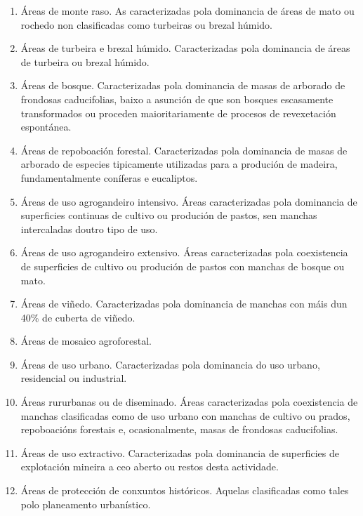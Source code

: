 \documentclass[11pt,a4paper]{article}
\begin{document}
\begin{enumerate}
 \item Áreas de monte raso. As caracterizadas pola dominancia de áreas de mato ou rochedo non clasificadas como turbeiras ou brezal húmido.
 \item Áreas de turbeira e brezal húmido. Caracterizadas pola dominancia de áreas de turbeira ou brezal húmido.
 \item Áreas de bosque. Caracterizadas pola dominancia de masas de arborado de frondosas caducifolias, baixo a asunción de que son bosques escasamente transformados ou proceden maioritariamente de procesos de revexetación espontánea.
 \item Áreas de repoboación forestal. Caracterizadas pola dominancia de masas de arborado de especies tipicamente utilizadas para a produción de madeira, fundamentalmente coníferas e eucaliptos.
 \item Áreas de uso agrogandeiro intensivo. Áreas caracterizadas pola dominancia de superficies continuas de cultivo ou produción de pastos, sen manchas intercaladas doutro tipo de uso.
 \item Áreas de uso agrogandeiro extensivo. Áreas caracterizadas pola coexistencia de superficies de cultivo ou produción de pastos con manchas de bosque ou mato.
 \item Áreas de viñedo. Caracterizadas pola dominancia de manchas con máis dun 40\% de cuberta de viñedo.
 \item Áreas de mosaico agroforestal.
 \item Áreas de uso urbano. Caracterizadas pola dominancia do uso urbano, residencial ou industrial.
 \item Áreas rururbanas ou de diseminado. Áreas caracterizadas pola coexistencia de manchas clasificadas como de uso urbano con manchas de cultivo ou prados, repoboacións forestais e, ocasionalmente, masas de frondosas caducifolias.
 \item Áreas de uso extractivo. Caracterizadas pola dominancia de superficies de explotación mineira a ceo aberto ou restos desta actividade.
 \item Áreas de protección de conxuntos históricos. Aquelas clasificadas como tales polo planeamento urbanístico.
\end{enumerate}
\end{document}
